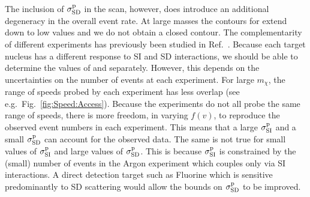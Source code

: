 The inclusion of $\sigmapsd$ in the scan, however, does introduce an additional degeneracy in the overall event rate. At large masses the contours for \sigmapsd extend down to low values and we do not obtain a closed contour. The complementarity of different experiments has previously been studied in Ref.~\cite{Cerdeno:2013}. Because each target nucleus has a different response to SI and SD interactions, we should be able to determine the values of \sigmapsi and \sigmapsd separately. However, this depends on the uncertainties on the number of events at each experiment. For large $m_\chi$, the range of speeds probed by each experiment has less overlap (see e.g.~Fig.~\ref{fig:Speed:Access}). Because the experiments do not all probe the same range of speeds, there is more freedom, in varying $f(v)$, to reproduce the observed event numbers in each experiment. This means that a large $\sigmapsi$ and a small $\sigmapsd$ can account for the observed data. The same is not true for small values of $\sigmapsi$ and large values of $\sigmapsd$. This is because $\sigmapsi$ is constrained by the (small) number of events in the Argon experiment which couples only via SI interactions. A direct detection target such as Fluorine which is sensitive predominantly to SD scattering would allow the bounds on $\sigmapsd$ to be improved.


